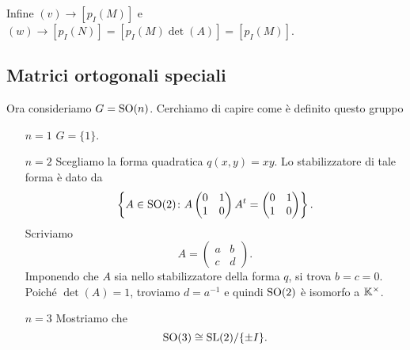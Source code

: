 \begin{example}
Infine $(v)\longrightarrow [p_I(M)]$ e $(w)\longrightarrow [p_I(N)]=[p_I(M)\det (A)]=[p_I(M)]$.
\end{example}


\subsection{Matrici ortogonali speciali}

Ora consideriamo $G=\operatorname{SO}(n)$. Cerchiamo di capire come \`e definito questo gruppo
\setlength{\leftmargini}{0cm}
\begin{itemize}
\item[$\boxed{n=1}$] $G=\{1\}$.
\item[$\boxed{n=2}$] Scegliamo la forma quadratica $q(x,y)=xy$. Lo stabilizzatore di tale forma è dato da 
\[\left\{A\in \operatorname{SO}(2)\colon A \begin{pmatrix}
    0 & 1 \\ 1& 0
\end{pmatrix}A^t=\begin{pmatrix}
    0 & 1 \\ 1& 0
\end{pmatrix}\right\}.\] 
Scriviamo 
\[A=\begin{pmatrix}
    a & b \\ c& d
\end{pmatrix}.\] 
Imponendo che $A$ sia nello stabilizzatore della forma $q$, si trova $b=c=0$. Poiché $\det(A)=1$, troviamo $d=a^{-1}$ e quindi $\operatorname{SO}(2)$ è isomorfo a $\mathbb{K}^\times$.
\item[$\boxed{n=3}$] Mostriamo che 
\[\operatorname{SO}(3)\cong \mathrm{SL}(2)/\{\pm I\}.\]
\end{itemize}
\setlength{\leftmargini}{0.5cm}

